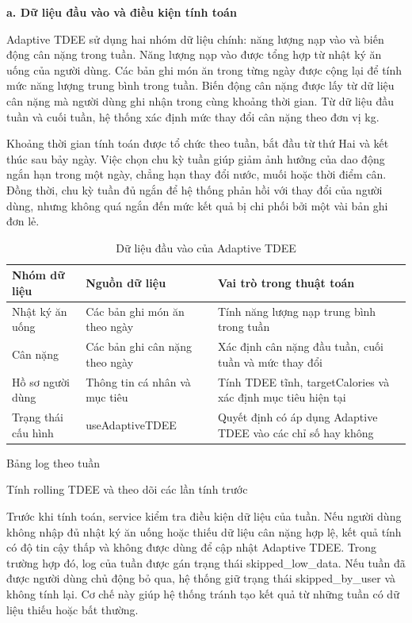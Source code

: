 \documentclass[12pt, a4paper]{report}
\begin{document}
\textbf{a. Dữ liệu đầu vào và điều kiện tính toán}

Adaptive TDEE sử dụng hai nhóm dữ liệu chính: năng lượng nạp vào và biến động cân nặng trong tuần. Năng lượng nạp vào được tổng hợp từ nhật ký ăn uống của người dùng. Các bản ghi món ăn trong từng ngày được cộng lại để tính mức năng lượng trung bình trong tuần. Biến động cân nặng được lấy từ dữ liệu cân nặng mà người dùng ghi nhận trong cùng khoảng thời gian. Từ dữ liệu đầu tuần và cuối tuần, hệ thống xác định mức thay đổi cân nặng theo đơn vị kg.

Khoảng thời gian tính toán được tổ chức theo tuần, bắt đầu từ thứ Hai và kết thúc sau bảy ngày. Việc chọn chu kỳ tuần giúp giảm ảnh hưởng của dao động ngắn hạn trong một ngày, chẳng hạn thay đổi nước, muối hoặc thời điểm cân. Đồng thời, chu kỳ tuần đủ ngắn để hệ thống phản hồi với thay đổi của người dùng, nhưng không quá ngắn đến mức kết quả bị chi phối bởi một vài bản ghi đơn lẻ.

\begin{table}[htbp]
\centering
\caption{Dữ liệu đầu vào của Adaptive TDEE}
\begin{tabular}{|p{4cm}|p{4cm}|p{7cm}|}
\hline
\textbf{Nhóm dữ liệu} & \textbf{Nguồn dữ liệu} & \textbf{Vai trò trong thuật toán} \\
\hline
Nhật ký ăn uống & Các bản ghi món ăn theo ngày & Tính năng lượng nạp trung bình trong tuần \\
\hline
Cân nặng & Các bản ghi cân nặng theo ngày & Xác định cân nặng đầu tuần, cuối tuần và mức thay đổi \\
\hline
Hồ sơ người dùng & Thông tin cá nhân và mục tiêu & Tính TDEE tĩnh, targetCalories và xác định mục tiêu hiện tại \\
\hline
Trạng thái cấu hình & useAdaptiveTDEE & Quyết định có áp dụng Adaptive TDEE vào các chỉ số hay không \\
\hline
\end{tabular}
\end{table}

Bảng log theo tuần

Tính rolling TDEE và theo dõi các lần tính trước

Trước khi tính toán, service kiểm tra điều kiện dữ liệu của tuần. Nếu người dùng không nhập đủ nhật ký ăn uống hoặc thiếu dữ liệu cân nặng hợp lệ, kết quả tính có độ tin cậy thấp và không được dùng để cập nhật Adaptive TDEE. Trong trường hợp đó, log của tuần được gán trạng thái skipped\_low\_data. Nếu tuần đã được người dùng chủ động bỏ qua, hệ thống giữ trạng thái skipped\_by\_user và không tính lại. Cơ chế này giúp hệ thống tránh tạo kết quả từ những tuần có dữ liệu thiếu hoặc bất thường.
\end{document}
